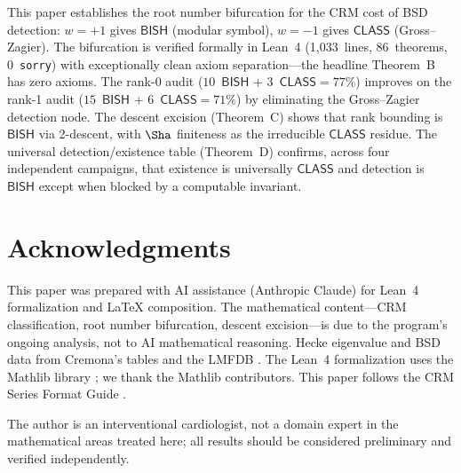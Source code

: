 \documentclass[11pt]{article}
\theoremstyle{plain}
\theoremstyle{definition}
\theoremstyle{remark}
\newcommand{\BISH}{\ensuremath{\mathsf{BISH}}}
\newcommand{\CLASS}{\ensuremath{\mathsf{CLASS}}}
\begin{document}
This paper establishes the root number bifurcation for the CRM cost of BSD detection: $w = +1$ gives $\BISH$ (modular symbol), $w = -1$ gives $\CLASS$ (Gross--Zagier). The bifurcation is verified formally in Lean~4 (1{,}033~lines, 86~theorems, 0~\texttt{sorry}) with exceptionally clean axiom separation---the headline Theorem~B has zero axioms. The rank-0 audit ($10$~$\BISH$ + $3$~$\CLASS = 77\%$) improves on the rank-1 audit ($15$~$\BISH$ + $6$~$\CLASS = 71\%$) by eliminating the Gross--Zagier detection node. The descent excision (Theorem~C) shows that rank bounding is $\BISH$ via 2-descent, with $\Sha$ finiteness as the irreducible $\CLASS$ residue. The universal detection/existence table (Theorem~D) confirms, across four independent campaigns, that existence is universally $\CLASS$ and detection is $\BISH$ except when blocked by a computable invariant.


\section*{Acknowledgments}

This paper was prepared with AI assistance (Anthropic Claude) for Lean~4 formalization and LaTeX composition. The mathematical content---CRM classification, root number bifurcation, descent excision---is due to the program's ongoing analysis, not to AI mathematical reasoning. Hecke eigenvalue and BSD data from Cremona's tables \cite{cremona} and the LMFDB \cite{lmfdb}. The Lean~4 formalization uses the Mathlib library \cite{mathlib4}; we thank the Mathlib contributors. This paper follows the CRM Series Format Guide \cite{format-guide}.

The author is an interventional cardiologist, not a domain expert in the mathematical areas treated here; all results should be considered preliminary and verified independently.
\end{document}
